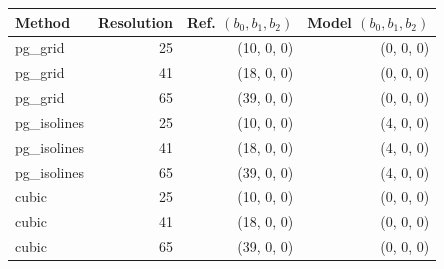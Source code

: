 \begin{tabular}{lrrr}\toprule
Method & Resolution & Ref. $(b_0,b_1,b_2)$ & Model $(b_0,b_1,b_2)$ \\ \midrule
pg\_grid & 25 & (10, 0, 0) & (0, 0, 0) \\
pg\_grid & 41 & (18, 0, 0) & (0, 0, 0) \\
pg\_grid & 65 & (39, 0, 0) & (0, 0, 0) \\
pg\_isolines & 25 & (10, 0, 0) & (4, 0, 0) \\
pg\_isolines & 41 & (18, 0, 0) & (4, 0, 0) \\
pg\_isolines & 65 & (39, 0, 0) & (4, 0, 0) \\
cubic & 25 & (10, 0, 0) & (0, 0, 0) \\
cubic & 41 & (18, 0, 0) & (0, 0, 0) \\
cubic & 65 & (39, 0, 0) & (0, 0, 0) \\
\bottomrule\end{tabular}
